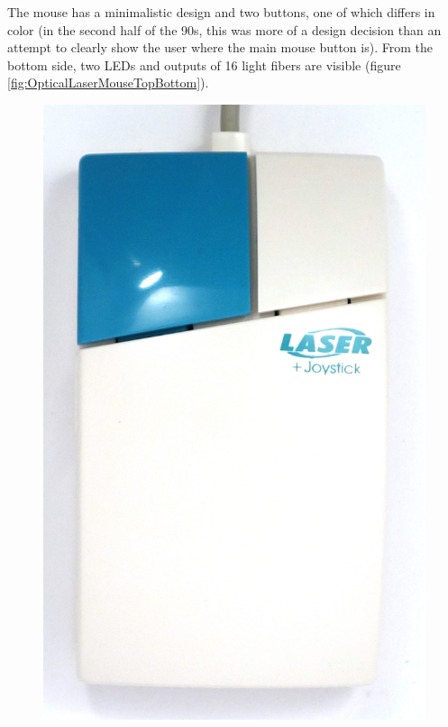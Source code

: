 \documentclass[11pt, a4paper]{article}
\begin{document}
The mouse has a minimalistic design and two buttons, one of which differs in color (in the second half of the 90s, this was more of a design decision than an attempt to clearly show the user where the main mouse button is). From the bottom side, two LEDs and outputs of 16 light fibers are visible (figure \ref{fig:OpticalLaserMouseTopBottom}).

\begin{figure}[h]
    \centering
    \includegraphics[scale=0.4]{1996_hi-bon_laser_mouse/top_60.jpg}

\end{figure}
\end{document}
